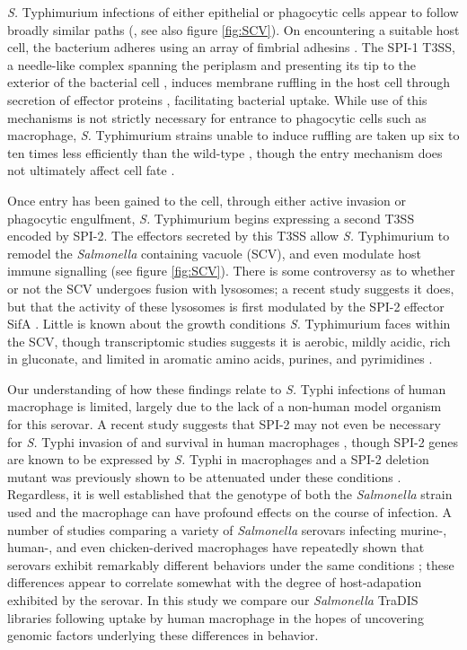 \textit{S.} Typhimurium infections of either epithelial or phagocytic cells appear to follow broadly similar paths (\textcite{Figueira2012}, see also figure \ref{fig:SCV}). On encountering a suitable host cell, the bacterium adheres using an array of fimbrial adhesins \parencite{Baumler1996a, Velden1998}. The SPI-1 T3SS, a needle-like complex spanning the periplasm and presenting its tip to the exterior of the bacterial cell \parencite{Mueller2008}, induces membrane ruffling in the host cell through secretion of effector proteins \parencite{Zhou2001}, facilitating bacterial uptake. While use of this mechanisms is not strictly necessary for entrance to phagocytic cells such as macrophage, {\it S.} Typhimurium strains unable to induce ruffling are taken up six to ten times less efficiently than the wild-type \parencite{Monack1996}, though the entry mechanism does not ultimately affect cell fate \parencite{Rathman1997}.

Once entry has been gained to the cell, through either active invasion or phagocytic engulfment, {\it S.} Typhimurium begins expressing a second T3SS encoded by SPI-2. The effectors secreted by this T3SS allow {\it S.} Typhimurium to remodel the \textit{Salmonella} containing vacuole (SCV), and even modulate host immune signalling (see figure \ref{fig:SCV}). There is some controversy as to whether or not the SCV undergoes fusion with lysosomes; a recent study suggests it does, but that the activity of these lysosomes is first modulated by the SPI-2 effector SifA \parencite{McGourty2012}. Little is known about the growth conditions {\it S.} Typhimurium faces within the SCV, though transcriptomic studies suggests it is aerobic, mildly acidic, rich in gluconate, and limited in aromatic amino acids, purines, and pyrimidines \parencite{Eriksson2003, Hautefort2008}.

Our understanding of how these findings relate to {\it S.} Typhi infections of human macrophage is limited, largely due to the lack of a non-human model organism for this serovar. A recent study suggests that SPI-2 may not even be necessary for {\it S.} Typhi invasion of and survival in human macrophages \parencite{Forest2010}, though SPI-2 genes are known to be expressed by {\it S.} Typhi in macrophages \parencite{Faucher2006} and a SPI-2 deletion mutant was previously shown to be attenuated under these conditions \parencite{Khan2003}. Regardless, it is well established that the genotype of both the \textit{Salmonella} strain used and the macrophage can have profound effects on the course of infection. A number of studies comparing a variety of \textit{Salmonella} serovars infecting murine-, human-, and even chicken-derived macrophages have repeatedly shown that serovars exhibit remarkably different behaviors under the same conditions \parencite{Vladoianu1990, Schwan2000, Okamura2005}; these differences appear to correlate somewhat with the degree of host-adapation exhibited by the serovar. In this study we compare our \textit{Salmonella} TraDIS libraries following uptake by human macrophage in the hopes of uncovering genomic factors underlying these differences in behavior.


